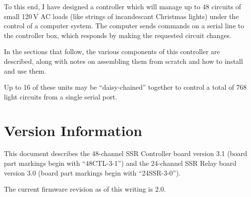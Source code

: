 \documentclass[12pt]{article}
\begin{document}
To this end, I have designed a controller which will manage up to 48
circuits of small 120\,V AC loads (like strings of incandescant Christmas 
lights) under the control of a computer system.  The computer sends
commands on a serial line to the controller box, which responds by
making the requested circuit changes.

In the sections that follow, the various components of this controller
are described, along with notes on assembling them from scratch and how
to install and use them.
 
Up to 16 of these units may be ``daisy-chained'' together to control a
total of 768 light circuits from a single serial port.

\section{Version Information}
This document describes the 48-channel SSR Controller board version 3.1
(board part markings begin with ``48CTL-3-1'') and the 24-channel SSR Relay
board version 3.0 (board part markings begin with ``24SSR-3-0'').

The current firmware revision as of this writing is 2.0.
\end{document}

